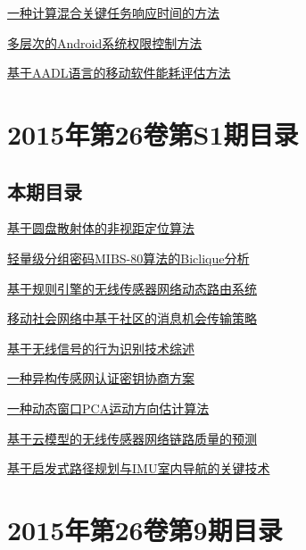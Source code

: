 \documentclass[a4paper]{article}
\begin{document}
\href{http://www.jos.org.cn/ch/reader/download_pdf.aspx?file_no=15036&year_id=2015&quarter_id=S2&falg=1}{一种计算混合关键任务响应时间的方法}

\href{http://www.jos.org.cn/ch/reader/download_pdf.aspx?file_no=15037&year_id=2015&quarter_id=S2&falg=1}{多层次的Android系统权限控制方法}

\href{http://www.jos.org.cn/ch/reader/download_pdf.aspx?file_no=15038&year_id=2015&quarter_id=S2&falg=1}{基于AADL语言的移动软件能耗评估方法}


\section{\textbf{2015年第26卷第S1期目录}}
\subsection{本期目录}
\href{http://www.jos.org.cn/ch/reader/download_pdf.aspx?file_no=15001&year_id=2015&quarter_id=S1&falg=1}{基于圆盘散射体的非视距定位算法}

\href{http://www.jos.org.cn/ch/reader/download_pdf.aspx?file_no=15002&year_id=2015&quarter_id=S1&falg=1}{轻量级分组密码MIBS-80算法的Biclique分析}

\href{http://www.jos.org.cn/ch/reader/download_pdf.aspx?file_no=15003&year_id=2015&quarter_id=S1&falg=1}{基于规则引擎的无线传感器网络动态路由系统}

\href{http://www.jos.org.cn/ch/reader/download_pdf.aspx?file_no=15004&year_id=2015&quarter_id=S1&falg=1}{移动社会网络中基于社区的消息机会传输策略}

\href{http://www.jos.org.cn/ch/reader/download_pdf.aspx?file_no=15005&year_id=2015&quarter_id=S1&falg=1}{基于无线信号的行为识别技术综述}

\href{http://www.jos.org.cn/ch/reader/download_pdf.aspx?file_no=15006&year_id=2015&quarter_id=S1&falg=1}{一种异构传感网认证密钥协商方案}

\href{http://www.jos.org.cn/ch/reader/download_pdf.aspx?file_no=15007&year_id=2015&quarter_id=S1&falg=1}{一种动态窗口PCA运动方向估计算法}

\href{http://www.jos.org.cn/ch/reader/download_pdf.aspx?file_no=15008&year_id=2015&quarter_id=S1&falg=1}{基于云模型的无线传感器网络链路质量的预测}

\href{http://www.jos.org.cn/ch/reader/download_pdf.aspx?file_no=15009&year_id=2015&quarter_id=S1&falg=1}{基于启发式路径规划与IMU室内导航的关键技术}


\section{\textbf{2015年第26卷第9期目录}}
\end{document}

